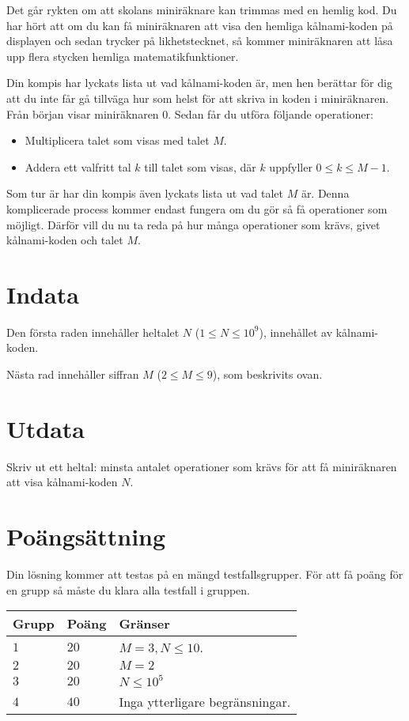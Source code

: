 Det går rykten om att skolans miniräknare kan trimmas med en hemlig kod.
Du har hört att om du kan få miniräknaren att visa den hemliga kålnami-koden på displayen och sedan
trycker på likhetstecknet, så kommer miniräknaren att låsa upp flera
stycken hemliga matematikfunktioner.

Din kompis har lyckats lista ut vad kålnami-koden är, men hen berättar för dig
att du inte får gå tillväga hur som helst för att skriva in koden i miniräknaren.
Från början visar miniräknaren $0$. Sedan får du utföra följande operationer:
\begin{itemize}
  \item Multiplicera talet som visas med talet $M$.
  \item Addera ett valfritt tal $k$ till talet som visas, där $k$ uppfyller $0 \leq k \leq M-1$.
\end{itemize}

Som tur är har din kompis även lyckats lista ut vad talet $M$ är. 
Denna komplicerade process kommer endast fungera om du gör så få operationer
som möjligt. Därför vill du nu ta reda på hur många operationer som krävs,
givet kålnami-koden och talet $M$.

\section*{Indata}
Den första raden innehåller heltalet $N$ ($1 \le N \le 10^9$), innehållet av kålnami-koden.

Nästa rad innehåller siffran $M$ ($2 \leq M \leq 9$), som beskrivits ovan.

\section*{Utdata}
Skriv ut ett heltal: minsta antalet operationer som krävs för att få miniräknaren att visa
kålnami-koden $N$.


\section*{Poängsättning}
Din lösning kommer att testas på en mängd testfallsgrupper.
För att få poäng för en grupp så måste du klara alla testfall i gruppen.

\noindent
\begin{tabular}{| l | l | p{12cm} |}
  \hline
  \textbf{Grupp} & \textbf{Poäng} & \textbf{Gränser} \\ \hline
  $1$    & $20$       & $M=3, N \leq 10$. \\ \hline
  $2$    & $20$       & $M=2$ \\ \hline
  $3$    & $20$       & $N \leq 10^5$ \\ \hline
  $4$    & $40$       & Inga ytterligare begränsningar. \\ \hline
\end{tabular}

